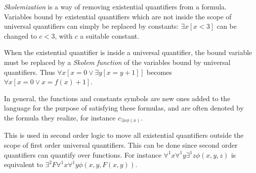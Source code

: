 \documentclass[12pt]{article}
\begin{document}
\emph{Skolemization} is a way of removing existential quantifiers from a formula.  Variables bound by existential quantifiers which are not inside the scope of universal quantifiers can simply be replaced by constants: $\exists x [x<3]$ can be changed to $c<3$, with $c$ a suitable constant.

When the existential quantifier is inside a universal quantifier, the bound variable must be replaced by a \emph{Skolem function} of the variables bound by universal quantifiers.  Thus $\forall x[x=0\vee\exists y[x=y+1]]$ becomes $\forall x[x=0\vee x=f(x)+1]$.

In general, the functions and constants symbols are new ones added to the language for the purpose of satisfying these formulas, and are often denoted by the formula they realize, for instance $c_{\exists x\phi(x)}$.

This is used in second order logic to move all existential quantifiers outside the scope of first order universal quantifiers.  This can be done since second order quantifiers can quantify over functions.  For instance $\forall^1 x\forall^1 y\exists^1 z\phi(x,y,z)$ is equivalent to $\exists^2 F\forall^1 x\forall^1 y\phi(x,y,F(x,y))$.
\end{document}
